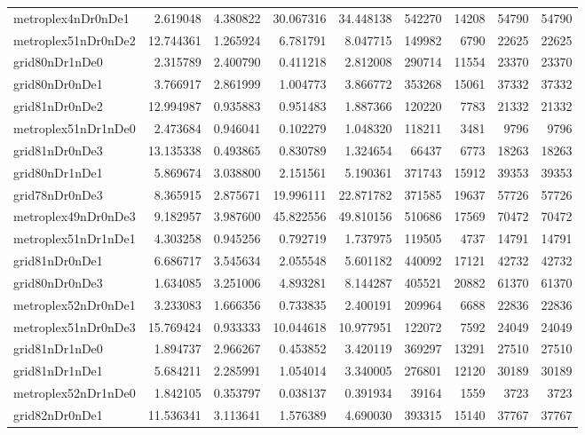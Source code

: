 \documentclass[../../../thesis.tex]{subfiles}
\begin{document}
\begin{longtable}{|l|r|r|r|r|r|r|r|r|}
metroplex4nDr0nDe1 & 2.619048 & 4.380822 & 30.067316 & 34.448138 & 542270 & 14208 & 54790 & 54790 \\
metroplex51nDr0nDe2 & 12.744361 & 1.265924 & 6.781791 & 8.047715 & 149982 & 6790 & 22625 & 22625 \\
grid80nDr1nDe0 & 2.315789 & 2.400790 & 0.411218 & 2.812008 & 290714 & 11554 & 23370 & 23370 \\
grid80nDr0nDe1 & 3.766917 & 2.861999 & 1.004773 & 3.866772 & 353268 & 15061 & 37332 & 37332 \\
grid81nDr0nDe2 & 12.994987 & 0.935883 & 0.951483 & 1.887366 & 120220 & 7783 & 21332 & 21332 \\
metroplex51nDr1nDe0 & 2.473684 & 0.946041 & 0.102279 & 1.048320 & 118211 & 3481 & 9796 & 9796 \\
grid81nDr0nDe3 & 13.135338 & 0.493865 & 0.830789 & 1.324654 & 66437 & 6773 & 18263 & 18263 \\
grid80nDr1nDe1 & 5.869674 & 3.038800 & 2.151561 & 5.190361 & 371743 & 15912 & 39353 & 39353 \\
grid78nDr0nDe3 & 8.365915 & 2.875671 & 19.996111 & 22.871782 & 371585 & 19637 & 57726 & 57726 \\
metroplex49nDr0nDe3 & 9.182957 & 3.987600 & 45.822556 & 49.810156 & 510686 & 17569 & 70472 & 70472 \\
metroplex51nDr1nDe1 & 4.303258 & 0.945256 & 0.792719 & 1.737975 & 119505 & 4737 & 14791 & 14791 \\
grid81nDr0nDe1 & 6.686717 & 3.545634 & 2.055548 & 5.601182 & 440092 & 17121 & 42732 & 42732 \\
grid80nDr0nDe3 & 1.634085 & 3.251006 & 4.893281 & 8.144287 & 405521 & 20882 & 61370 & 61370 \\
metroplex52nDr0nDe1 & 3.233083 & 1.666356 & 0.733835 & 2.400191 & 209964 & 6688 & 22836 & 22836 \\
metroplex51nDr0nDe3 & 15.769424 & 0.933333 & 10.044618 & 10.977951 & 122072 & 7592 & 24049 & 24049 \\
grid81nDr1nDe0 & 1.894737 & 2.966267 & 0.453852 & 3.420119 & 369297 & 13291 & 27510 & 27510 \\
grid81nDr1nDe1 & 5.684211 & 2.285991 & 1.054014 & 3.340005 & 276801 & 12120 & 30189 & 30189 \\
metroplex52nDr1nDe0 & 1.842105 & 0.353797 & 0.038137 & 0.391934 & 39164 & 1559 & 3723 & 3723 \\
grid82nDr0nDe1 & 11.536341 & 3.113641 & 1.576389 & 4.690030 & 393315 & 15140 & 37767 & 37767 \\

\end{longtable}
\end{document}
